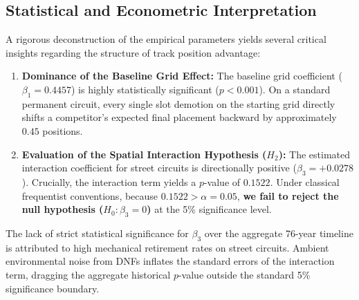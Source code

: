 \subsection{Statistical and Econometric Interpretation}
\label{subsec:ols_interpretation}

A rigorous deconstruction of the empirical parameters yields several critical insights regarding the structure of track position advantage:
\begin{enumerate}
    \item \textbf{Dominance of the Baseline Grid Effect:} The baseline grid coefficient ($\beta_1 = 0.4457$) is highly statistically significant ($p < 0.001$). On a standard permanent circuit, every single slot demotion on the starting grid directly shifts a competitor's expected final placement backward by approximately $0.45$ positions.
    \item \textbf{Evaluation of the Spatial Interaction Hypothesis ($H_2$):} The estimated interaction coefficient for street circuits is directionally positive ($\beta_3 = +0.0278$). Crucially, the interaction term yields a $p$-value of $0.1522$. Under classical frequentist conventions, because $0.1522 > \alpha = 0.05$, \textbf{we fail to reject the null hypothesis ($H_0: \beta_3 = 0$)} at the 5\% significance level. 
\end{enumerate}
The lack of strict statistical significance for $\beta_3$ over the aggregate 76-year timeline is attributed to high mechanical retirement rates on street circuits. Ambient environmental noise from DNFs inflates the standard errors of the interaction term, dragging the aggregate historical $p$-value outside the standard 5\% significance boundary.
